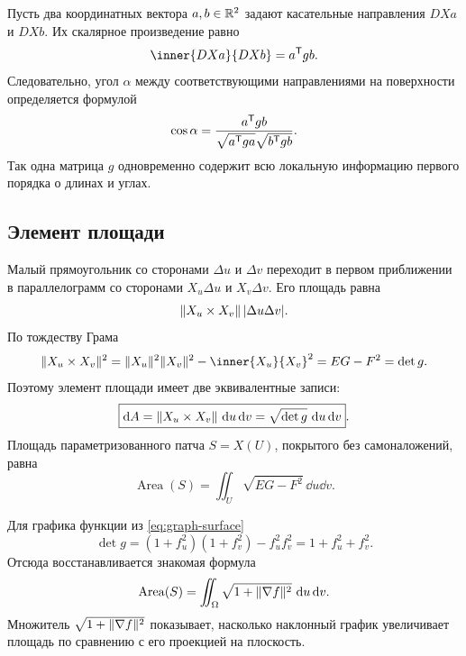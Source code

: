 Пусть два координатных вектора \(a,b\in\mathbb{R}^2\) задают касательные направления \(D Xa\) и \(D Xb\). Их скалярное произведение равно
\begin{equation}
\label{eq:surface-angle-metric-product}
\inner{D Xa}{D Xb}=a^{\trans}gb.
\end{equation}
Следовательно, угол \(\alpha\) между соответствующими направлениями на поверхности определяется формулой
\begin{equation}
\label{eq:surface-angle-metric}
\cos\alpha
=
\frac{a^{\mathsf{T}}gb}
{\sqrt{a^{\mathsf{T}}ga}\sqrt{b^{\mathsf{T}}gb}}.
\end{equation}
Так одна матрица \(g\) одновременно содержит всю локальную информацию первого порядка о длинах и углах.

\subsection{Элемент площади}

Малый прямоугольник со сторонами \(\Delta u\) и \(\Delta v\) переходит в первом приближении в параллелограмм со сторонами \(X_u\Delta u\) и \(X_v\Delta v\). Его площадь равна
\[
\lVert X_u\times X_v\rVert\,\lvert\Delta u\Delta v\rvert.
\]
По тождеству Грама
\begin{equation}
\label{eq:surface-area-gram}
\norm{X_u\times X_v}^2
=\norm{X_u}^2\norm{X_v}^2-\inner{X_u}{X_v}^2
=EG-F^2
=\det g.
\end{equation}
Поэтому элемент площади имеет две эквивалентные записи:
\begin{equation}
\label{eq:surface-area-element}
\boxed{
\mathop{}\!\mathrm{d} A
=\lVert X_u\times X_v\rVert\,\mathop{}\!\mathrm{d} u\mathop{}\!\mathrm{d} v
=\sqrt{\det g}\,\mathop{}\!\mathrm{d} u\mathop{}\!\mathrm{d} v
}.
\end{equation}
Площадь параметризованного патча \(S=X(U)\), покрытого без самоналожений, равна
\begin{equation}
\label{eq:parametric-surface-area}
\operatorname{Area}(S)
=\iint_U\sqrt{EG-F^2}\,\dd u\dd v.
\end{equation}

Для графика функции из \eqref{eq:graph-surface}
\[
\det g
=(1+f_u^2)(1+f_v^2)-f_u^2f_v^2
=1+f_u^2+f_v^2.
\]
Отсюда восстанавливается знакомая формула
\begin{equation}
\label{eq:graph-surface-area}
\operatorname{Area}(S)
=\iint_\Omega\sqrt{1+\lVert\nabla f\rVert^2}\,\mathop{}\!\mathrm{d} u\mathop{}\!\mathrm{d} v.
\end{equation}
Множитель \(\sqrt{1+\lVert\nabla f\rVert^2}\) показывает, насколько наклонный график увеличивает площадь по сравнению с его проекцией на плоскость.

